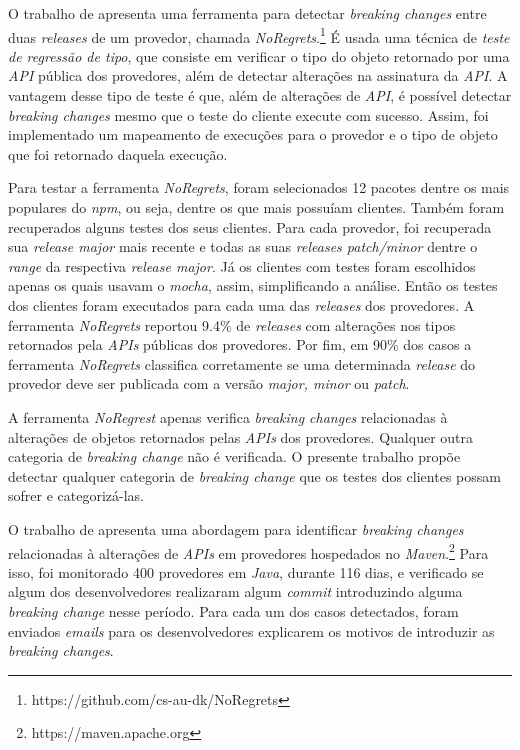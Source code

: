 O trabalho de  apresenta uma ferramenta para detectar \textit{breaking changes} entre duas \textit{releases} de um provedor, chamada \textit{NoRegrets}.\footnote{https://github.com/cs-au-dk/NoRegrets} É usada uma técnica de \textit{teste de regressão de tipo}, que consiste em verificar o tipo do objeto retornado por uma \textit{API} pública dos provedores, além de detectar alterações na assinatura da \textit{API}. A vantagem desse tipo de teste é que, além de alterações de \textit{API}, é possível detectar \textit{breaking changes} mesmo que o teste do cliente execute com sucesso. Assim, foi implementado um mapeamento de execuções para o provedor e o tipo de objeto que foi retornado daquela execução.

Para testar a ferramenta \textit{NoRegrets}, foram selecionados 12 pacotes dentre os mais populares do \textit{npm}, ou seja, dentre os que mais possuíam clientes. Também foram recuperados alguns testes dos seus clientes. Para cada provedor, foi recuperada sua \textit{release major} mais recente e todas as suas \textit{releases patch/minor} dentre o \textit{range} da respectiva \textit{release major}. Já os clientes com testes foram escolhidos apenas os quais usavam o \textit{mocha}, assim, simplificando a análise. Então os testes dos clientes foram executados para cada uma das \textit{releases} dos provedores. A ferramenta \textit{NoRegrets} reportou 9.4\% de \textit{releases} com alterações nos tipos retornados pela \textit{APIs} públicas dos provedores. Por fim, em 90\% dos casos a ferramenta \textit{NoRegrets} classifica corretamente se uma determinada \textit{release} do provedor deve ser publicada com a versão \textit{major, minor} ou \textit{patch}.

A ferramenta \textit{NoRegrest} apenas verifica \textit{breaking changes} relacionadas à alterações de objetos retornados pelas \textit{APIs} dos provedores. Qualquer outra categoria de \textit{breaking change} não é verificada. O presente trabalho propõe detectar qualquer categoria de \textit{breaking change} que os testes dos clientes possam sofrer e categorizá-las.

O trabalho de  apresenta uma abordagem para identificar \textit{breaking changes} relacionadas à alterações de \textit{APIs} em provedores hospedados no \textit{Maven}.\footnote{https://maven.apache.org} Para isso, foi monitorado 400 provedores em \textit{Java}, durante 116 dias, e verificado se algum dos desenvolvedores realizaram algum \textit{commit} introduzindo alguma \textit{breaking change} nesse período.  Para cada um dos casos detectados, foram enviados \textit{emails} para os desenvolvedores explicarem os motivos de introduzir as \textit{breaking changes}.


